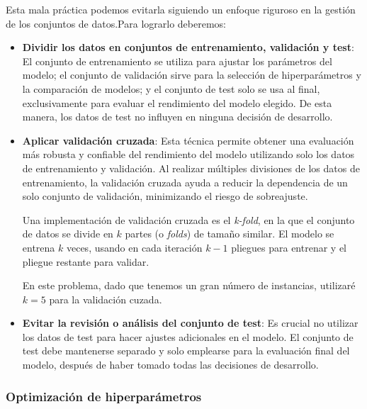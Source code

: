 Esta mala práctica podemos evitarla siguiendo un enfoque riguroso en la gestión de los conjuntos de datos.Para lograrlo deberemos:

\begin{itemize}

    \item \textbf{Dividir los datos en conjuntos de entrenamiento, validación y test}: El conjunto de entrenamiento se utiliza para ajustar los parámetros del modelo; el conjunto de validación sirve para la selección de hiperparámetros y la comparación de modelos; y el conjunto de test solo se usa al final, exclusivamente para evaluar el rendimiento del modelo elegido. De esta manera, los datos de test no influyen en ninguna decisión de desarrollo.

    \item \textbf{Aplicar validación cruzada}: Esta técnica permite obtener una evaluación más robusta y confiable del rendimiento del modelo utilizando solo los datos de entrenamiento y validación. Al realizar múltiples divisiones de los datos de entrenamiento, la validación cruzada ayuda a reducir la dependencia de un solo conjunto de validación, minimizando el riesgo de sobreajuste.

    Una implementación de validación cruzada es el \textit{k-fold}, en la que el conjunto de datos se divide en $k$ partes (o \textit{folds}) de tamaño similar. El modelo se entrena $k$ veces, usando en cada iteración $k-1$ pliegues para entrenar y el pliegue restante para validar. 

    En este problema, dado que tenemos un gran número de instancias, utilizaré $k=5$ para la validación cuzada.
    
    \item \textbf{Evitar la revisión o análisis del conjunto de test}: Es crucial no utilizar los datos de test para hacer ajustes adicionales en el modelo. El conjunto de test debe mantenerse separado y solo emplearse para la evaluación final del modelo, después de haber tomado todas las decisiones de desarrollo.
    
\end{itemize}


\subsubsection{Optimización de hiperparámetros}

